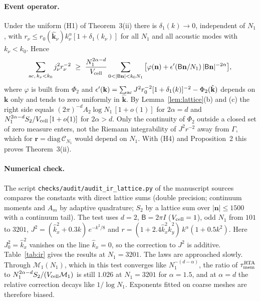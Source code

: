 \documentclass[aps,prb,10pt,onecolumn,amsmath,amssymb,superscriptaddress,nofootinbib]{revtex4-2}
\theoremstyle{plain}
\newcommand{\Cop}{\mathcal C}
\newcommand{\tmem}{\tau_{\rm mem}}
\begin{document}
\paragraph*{Event operator.}
Under the uniform (H1) of Theorem~3(ii) there is $\delta_1(k)\to0$, independent of $N_1$, with
$r_\nu\le r_0(\hat{\mathbf k}_\nu)k_\nu^\alpha[1+\delta_1(k_\nu)]$ for all $N_1$ and all acoustic modes with
$k_\nu<k_0$. Hence
\begin{equation}
\sum_{{\rm ac},\,k_\nu<k_0}j_\nu^2r_\nu^{-2}\ \ge\ \frac{N_1^{2\alpha-d}}{V_{\rm cell}}
\sum_{0<|\mathsf B\mathbf n|<k_0N_1}\big[\varphi(\mathbf n)+\epsilon'(\mathsf B\mathbf n/N_1)\,|\mathsf B\mathbf n|^{-2\alpha}\big],
\end{equation}
where $\varphi$ is built from $\Phi_2$ and
$\epsilon'(\mathbf k)=\sum_{\rm ac}J^2r_0^{-2}[1+\delta_1(k)]^{-2}-\Phi_2(\hat{\mathbf k})$ depends on $\mathbf k$
only and tends to zero uniformly in $\hat{\mathbf k}$. By Lemma~\ref{lem:lattice}(b) and (c) the right
side equals $(2\pi)^{-d}A_2\log N_1\,[1+o(1)]$ for $2\alpha=d$ and
$N_1^{2\alpha-d}S_2/V_{\rm cell}\,[1+o(1)]$ for $2\alpha>d$. Only the continuity of $\Phi_2$ outside a
closed set of zero measure enters, not the Riemann integrability of $J^2r^{-2}$ away from $\Gamma$, which
for $\mathbf r=\mathrm{diag}\,\Cop_{N_1}$ would depend on $N_1$. With (H4) and Proposition~2 this proves
Theorem~3(ii).

\paragraph*{Numerical check.}
The script \texttt{checks/\allowbreak audit/\allowbreak audit\_ir\_lattice.py} of the manuscript sources
compares the constants with direct lattice sums (double precision; continuum moments and $A_m$ by adaptive
quadrature; $S_2$ by a lattice sum over $|\mathbf n|\le1500$ with a continuum tail).
The test uses $d=2$, $\mathsf B=2\pi I$ ($V_{\rm cell}=1$), odd $N_1$ from $101$ to $3201$,
$J^2=(\hat k_x^2+0.3k)\,e^{-k^2/8}$ and $r=(1+2.4\hat k_x^2\hat k_y^2)\,k^\alpha(1+0.5k^2)$. Here
$J_0^2=\hat k_x^2$ vanishes on the line $\hat k_x=0$, so the correction to $J^2$ is additive.
Table~\ref{tab:ir} gives the results at $N_1=3201$. The laws are approached slowly. Through
$\mathcal M_1(N_1)$, which in this test converges like $N_1^{-(d-\alpha)}$, the ratio of
$\tmem^{\rm RTA}$ to $N_1^{2\alpha-d}S_2/(V_{\rm cell}\mathcal M_1)$ is still $1.026$ at $N_1=3201$ for
$\alpha=1.5$, and at $\alpha=d$ the relative correction decays like $1/\log N_1$. Exponents fitted on
coarse meshes are therefore biased.
\end{document}

